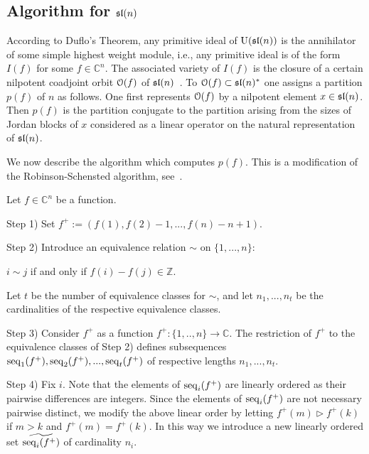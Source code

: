 \documentclass[10pt]{amsart}\oddsidemargin -1mm \evensidemargin -1mm \topmargin -15mm\headheight5mm \headsep 3.5mm \textheight 245mm\textwidth 170mm %
\theoremstyle{definition}\newtheorem{theorem}{Theorem}[section]\newtheorem{lemma}[theorem]{Lemma}\newtheorem{remark}[theorem]{Remark}\newtheorem{proposition}[theorem]{Proposition}\newtheorem{corollary}[theorem]{Corollary}\newtheorem{definition}[theorem]{Definition}\newtheorem{Ex}[theorem]{Example}
\begin{document}
\subsection{Algorithm for $\frak{sl}(n)$}\label{SSrsa}%
According to Duflo's Theorem, any primitive ideal of
$\operatorname{\mathrm{U}}(\frak{sl}(n))$ is the annihilator of some simple highest weight
module, i.e., any primitive ideal is of the form $I(f)$ for some $f\in\mathbb C^n$. %
 The associated variety %
of $I(f)$ is the closure of a certain nilpotent
coadjoint orbit $\EuScript O(f)$ of $\frak{sl}(n)$~\cite{Jo4}. To $\EuScript O(f)\subset\frak{sl}(n)^*$ one assigns a partition $p(f)$ of $n$ as follows. %
One first represents $\EuScript O(f)$ by a nilpotent element $x\in\frak{sl}(n)$. Then $p(f)$ is the partition conjugate to the partition arising from the sizes of Jordan blocks of $x$ considered as a linear operator on the natural representation of $\frak{sl}(n)$.

We now describe the algorithm which computes $p(f)$. This is a modification of the Robinson-Schensted algorithm, see~\cite[Theorem A on p. 52]{Knu}.

Let $f\in\mathbb C^n$ be a function. %

Step 1) Set $f^+:= (f(1), f(2)-1,..., f(n)-n+1)$.

Step 2) Introduce an equivalence relation $\sim$ on $\{1,..., n\}$:
\begin{center}$i\sim j$ if and only if $f(i)-f(j)\in\mathbb Z$.\end{center}
Let $t$ be the number of equivalence classes for $\sim$, and let $n_1,..., n_t$ be the cardinalities of the respective equivalence classes.

Step 3) Consider $f^+$ as a function $f^+:\{1,.., n\}\to\mathbb C$. The restriction of $f^+$ to the equivalence classes of Step 2) defines subsequences $\operatorname{\mathrm{seq}}_1(f^+),
\operatorname{\mathrm{seq}}_2(f^+),..., \operatorname{\mathrm{seq}}_t(f^+)$ of respective lengths $n_1,...,
n_t$.%

Step 4) Fix $i$. Note that the elements of $\operatorname{\mathrm{seq}}_i(f^+)$ are linearly ordered as their pairwise differences are integers. Since the elements of $\operatorname{\mathrm{seq}}_i(f^+)$ are not necessary pairwise distinct, we modify the above linear order by letting $f^+(m)\triangleright f^+(k)$ if $m>k$ and $f^+(m)=f^+(k)$. In this way we introduce a new linearly ordered set $\widetilde{\operatorname{\mathrm{seq}}_i(f^+)}$ of cardinality $n_i$.
\end{document}
